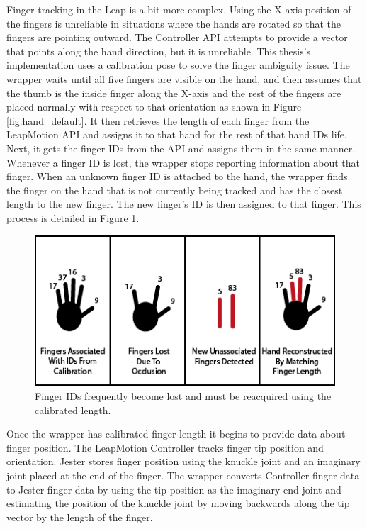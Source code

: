 Finger tracking in the Leap is a bit more complex. Using the X-axis position of the fingers is unreliable in situations where the hands are rotated so that the fingers are pointing outward. The Controller API attempts to provide a vector that points along the hand direction, but it is unreliable. This thesis's implementation uses a calibration pose to solve the finger ambiguity issue. The wrapper waits until all five fingers are visible on the hand, and then assumes that the thumb is the inside finger along the X-axis and the rest of the fingers are placed normally with respect to that orientation as shown in Figure \ref{fig:hand_default}. It then retrieves the length of each finger from the LeapMotion API and assigns it to that hand for the rest of that hand IDs life. Next, it gets the finger IDs from the API and assigns them in the same manner. Whenever a finger ID is lost, the wrapper stops reporting information about that finger. When an unknown finger ID is attached to the hand, the wrapper finds the finger on the hand that is not currently being tracked and has the closest length to the new finger. The new finger's ID is then assigned to that finger. This process is detailed in Figure \ref{fig:finger_matching}. 

\begin{figure}[]
\centering
\includegraphics[width=.75\textwidth]{figures/fingerAssociation}
\caption{Finger IDs frequently become lost and must be reacquired using the calibrated length.}
\label{fig:finger_matching}
\end{figure}

Once the wrapper has calibrated finger length it begins to provide data about finger position. The LeapMotion Controller tracks finger tip position and orientation. Jester stores finger position using the knuckle joint and an imaginary joint placed at the end of the finger. The wrapper converts Controller finger data to Jester finger data by using the tip position as the imaginary end joint and estimating the position of the knuckle joint by moving backwards along the tip vector by the length of the finger.

